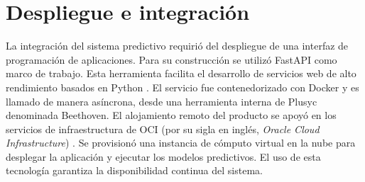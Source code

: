 \section{Despliegue e integración}
\label{sec:despliegue}
La integración del sistema predictivo requirió del despliegue de una interfaz de programación de aplicaciones. Para su construcción se utilizó FastAPI \citep{ramirez2018fastapi} como marco de trabajo. Esta herramienta facilita el desarrollo de servicios web de alto rendimiento basados en Python \citep{python3}.
El servicio fue contenedorizado con Docker \citep{merkel2014docker} y es llamado de manera asíncrona, desde una herramienta interna de Plusyc denominada Beethoven.
El alojamiento remoto del producto se apoyó en los servicios de infraestructura de OCI (por su sigla en inglés, \textit{Oracle Cloud Infrastructure}) \citep{oracle_oci}. Se provisionó una instancia de cómputo virtual en la nube para desplegar la aplicación y ejecutar los modelos predictivos. El uso de esta tecnología garantiza la disponibilidad continua del sistema.








